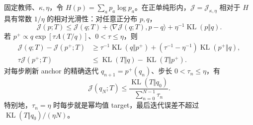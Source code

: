 \documentclass[lang=cn,scheme=chinese,openany]{../book/elegantbook}
\newcommand{\KL}{\operatorname{KL}}
\begin{document}
\begin{theorem}
\label{thm:power-md-relative-smoothness}
固定教师、$\kappa,\eta$，令 $H(p)=\sum_ap_a\log p_a$。在正单纯形内，$\mathcal J=\mathcal J_{\kappa,\eta}$ 相对于 $H$ 具有常数 $1/\eta$ 的相对光滑性：对任意正分布 $p,q$，
\begin{equation}
 \mathcal J(p;T)\le\mathcal J(q;T)+\langle\nabla\mathcal J(q;T),p-q\rangle
       +\eta^{-1}\KL(p\Vert q).
 \label{eq:power-md-relative-smoothness}
\end{equation}
若 $p^+\propto q\exp[\tau A(T/q)]$、$0<\tau\le\eta$，则
\begin{align}
 \mathcal J(q;T)-\mathcal J(p^+;T)
 &\ge\tau^{-1}\KL(q\Vert p^+)
  +(\tau^{-1}-\eta^{-1})\KL(p^+\Vert q),\\
 \tau\mathcal J(p^+;T)
 &\le\KL(T\Vert q)-\KL(T\Vert p^+).
 \label{eq:power-md-single-step-progress}
\end{align}
对每步刷新 anchor 的精确迭代 $q_{n+1}=p^+(q_n)$、步长 $0<\tau_n\le\eta$，有
\begin{equation}
 \mathcal J(q_N;T)\le
 \frac{\KL(T\Vert q_0)}{\sum_{n=0}^{N-1}\tau_n}.
 \label{eq:power-md-last-iterate-rate}
\end{equation}
特别地，$\tau_n=\eta$ 时每步就是幂均值 target，最后迭代误差不超过 $\KL(T\Vert q_0)/(\eta N)$。
\end{theorem}
\end{document}
